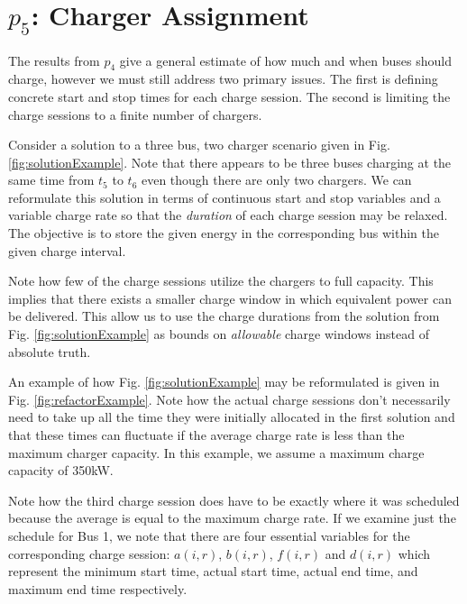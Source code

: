 



\section{$p_5$: Charger Assignment\label{sec:chargerAssignment}}
The results from $p_4$ give a general estimate of how much and when buses should charge, however we must still address two primary issues. The first is defining concrete start and stop times for each charge session. The second is limiting the charge sessions to a finite number of chargers. 
\par Consider a solution to a three bus, two charger scenario given in Fig. \ref{fig:solutionExample}.
Note that there appears to be three buses charging at the same time from $t_5$ to $t_6$ even though there are only two chargers.  We can reformulate this solution in terms of continuous start and stop variables and a variable charge rate so that the {\it duration} of each charge session may be relaxed. The objective is to store the given energy in the corresponding bus within the given charge interval.  
\par Note how few of the charge sessions utilize the chargers to full capacity. This implies that there exists a smaller charge window in which equivalent power can be delivered. This allow us to use the charge durations from the solution from Fig. \ref{fig:solutionExample} as bounds on {\it allowable} charge windows instead of absolute truth. 
\par An example of how Fig. \ref{fig:solutionExample} may be reformulated is given in Fig. \ref{fig:refactorExample}. Note how the actual charge sessions don't necessarily need to take up all the time they were initially allocated in the first solution and that these times can fluctuate if the average charge rate is less than the maximum charger capacity. In this example, we assume a maximum charge capacity of 350kW.  
\par Note how the third charge session does have to be exactly where it was scheduled because the average is equal to the maximum charge rate.
If we examine just the schedule for Bus 1, we note that there are four essential variables for the corresponding charge session: $a(i,r)$, $b(i,r)$, $f(i,r)$ and $d(i,r)$ which represent the minimum start time, actual start time, actual end time, and maximum end time respectively. 
